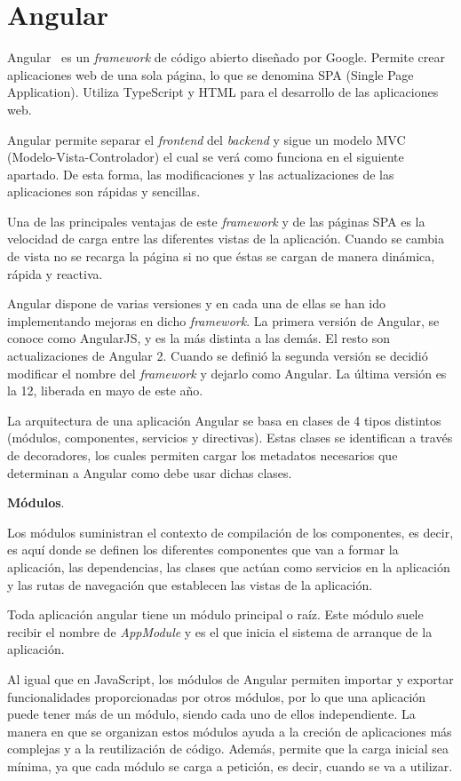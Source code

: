 \documentclass[a4paper, 12pt]{book}
\begin{document}
\section{Angular} 
\label{sec:angular}

Angular~\cite{angular} es un \emph{framework} de código abierto diseñado por Google. Permite crear aplicaciones web de una sola página, lo que se denomina SPA (Single Page Application). Utiliza TypeScript y HTML para el desarrollo de las aplicaciones web. 

Angular permite separar el \emph{frontend} del \emph{backend} y sigue un modelo MVC (Modelo-Vista-Controlador) el cual se verá como funciona en el siguiente apartado. De esta forma, las modificaciones y las actualizaciones de las aplicaciones son rápidas y sencillas. 

Una de las principales ventajas de este \emph{framework} y de las páginas SPA es la velocidad de carga entre las diferentes vistas de la aplicación. Cuando se cambia de vista no se recarga la página si no que éstas se cargan de manera dinámica, rápida y reactiva. 

Angular dispone de varias versiones y en cada una de ellas se han ido implementando mejoras en dicho \emph{framework}. La primera versión de Angular, se conoce como AngularJS, y es la más distinta a las demás. El resto son actualizaciones de Angular 2. Cuando se definió la segunda versión se decidió modificar el nombre del \emph{framework} y dejarlo como Angular. La última versión es la 12, liberada en mayo de este año.

La arquitectura de una aplicación Angular se basa en clases de 4 tipos distintos (módulos, componentes, servicios y directivas). Estas clases se identifican a través de decoradores, los cuales permiten cargar los metadatos necesarios que determinan a Angular como debe usar dichas clases.

\textbf{Módulos}.

Los módulos suministran el contexto de compilación de los componentes, es decir, es aquí donde se definen los diferentes componentes que van a formar la aplicación, las dependencias, las clases que actúan como servicios en la aplicación y las rutas de navegación que establecen las vistas de la aplicación. 

Toda aplicación angular tiene un módulo principal o raíz. Este módulo suele recibir el nombre de \emph{AppModule} y es el que inicia el sistema de arranque de la aplicación.

Al igual que en JavaScript, los módulos de Angular permiten importar y exportar funcionalidades proporcionadas por otros módulos, por lo que una aplicación puede tener más de un módulo, siendo cada uno de ellos independiente. La manera en que se organizan estos módulos ayuda a la creción de aplicaciones más complejas y a la reutilización de código. Además, permite que la carga inicial sea mínima, ya que cada módulo se carga a petición, es decir, cuando se va a utilizar. 
\end{document}
